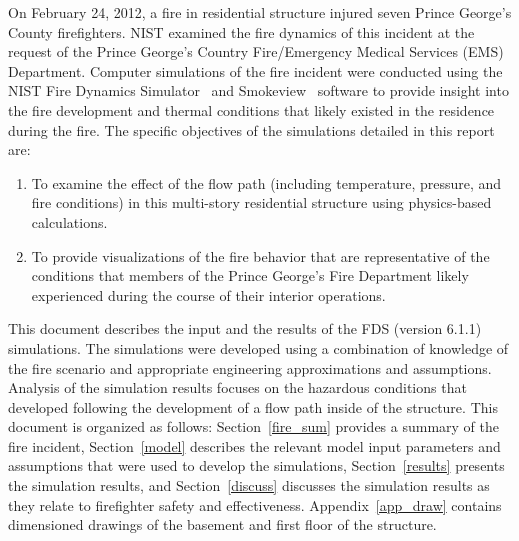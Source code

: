 \documentclass[12pt,oneside]{book}
\begin{document}
On February 24, 2012, a fire in residential structure injured seven Prince George's County firefighters. NIST examined the fire dynamics of this incident at the request of the Prince George's Country Fire/Emergency Medical Services (EMS) Department. Computer simulations of the fire incident were conducted using the NIST Fire Dynamics Simulator~\cite{FDS_Users_Guide} and Smokeview~\cite{Smokeview_Users_Guide}  software to provide insight into the fire development and thermal conditions that likely existed in the residence during the fire. The specific objectives of the simulations detailed in this report are: 
\begin{enumerate}
\item To examine the effect of the flow path (including temperature, pressure, and fire conditions) in this multi-story residential structure using physics-based calculations.
\item To provide visualizations of the fire behavior that are representative of the conditions that members of the Prince George's Fire Department likely experienced during the course of their interior operations.
\end{enumerate}

This document describes the input and the results of the FDS (version 6.1.1) simulations. The simulations were developed using a combination of knowledge of the fire scenario and appropriate engineering approximations and assumptions. Analysis of the simulation results focuses on the hazardous conditions that developed following the development of a flow path inside of the structure. This document is organized as follows: Section~\ref{fire_sum} provides a summary of the fire incident, Section~\ref{model} describes the relevant model input parameters and assumptions that were used to develop the simulations, Section~\ref{results} presents the simulation results, and Section~\ref{discuss} discusses the simulation results as they relate to firefighter safety and effectiveness. Appendix~\ref{app_draw} contains dimensioned drawings of the basement and first floor of the structure.
\end{document}
